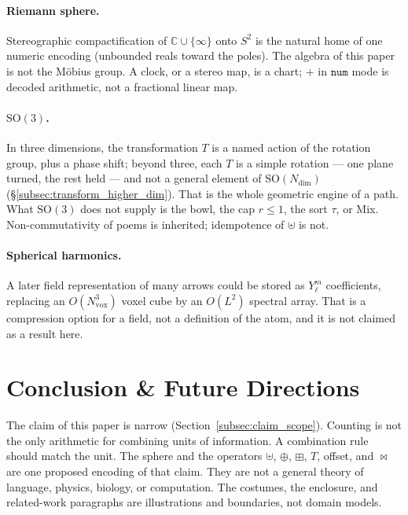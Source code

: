 \documentclass[12pt, a4paper]{article}
\begin{document}
\paragraph{Riemann sphere.}
Stereographic compactification of $\mathbb{C}\cup\{\infty\}$ onto $S^2$
is the natural home of one numeric encoding (unbounded reals toward the
poles). The algebra of this paper is not the M\"obius group. A clock,
or a stereo map, is a chart; $+$ in $\mathtt{num}$ mode is decoded
arithmetic, not a fractional linear map.

\paragraph{$\mathrm{SO}(3)$.}
In three dimensions, the transformation $T$ is a named action of the
rotation group, plus a phase shift; beyond three, each $T$ is a simple
rotation --- one plane turned, the rest held --- and not a general
element of $\mathrm{SO}(N_{\mathrm{dim}})$
(\S\ref{subsec:transform_higher_dim}). That is the whole geometric engine of a path. What
$\mathrm{SO}(3)$ does not supply is the bowl, the cap $r\le 1$, the
sort $\tau$, or Mix. Non-commutativity of poems is inherited;
idempotence of $\uplus$ is not.

\paragraph{Spherical harmonics.}
A later field representation of many arrows could be stored as
$Y_\ell^m$ coefficients, replacing an $O(N_{\mathrm{vox}}^3)$ voxel cube by an
$O(L^2)$ spectral array. That is a compression option for a field, not
a definition of the atom, and it is not claimed as a result here.

\section{Conclusion \& Future Directions}
\label{sec:conclusion}

The claim of this paper is narrow
(Section~\ref{subsec:claim_scope}). Counting is not the only
arithmetic for combining units of information. A combination rule
should match the unit. The sphere and the operators
$\uplus$, $\oplus$, $\boxplus$, $T$, offset, and $\bowtie$ are one proposed
encoding of that claim. They are not a general theory of language,
physics, biology, or computation. The costumes, the enclosure, and
related-work paragraphs are illustrations and boundaries, not domain
models.
\end{document}
